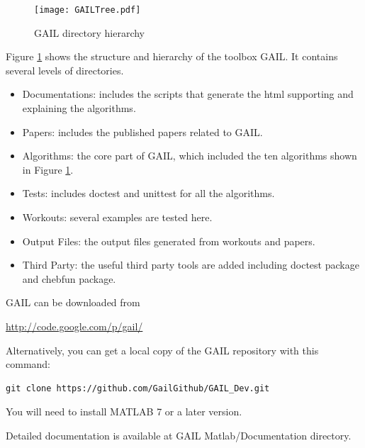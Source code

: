 \documentclass{iitthesis}
\theoremstyle{definition}
\begin{document}
\begin{figure}
\centering
\texttt{[image: GAILTree.pdf]} 
\caption{GAIL directory hierarchy \label{GAILTree}}
\end{figure}


Figure \ref{GAILTree} shows the structure and hierarchy of the toolbox GAIL. It contains several levels of directories.
\begin{itemize}
\item Documentations: includes the scripts that generate the html supporting and explaining the algorithms.
\item Papers: includes the published papers related to GAIL.
\item Algorithms: the core part of GAIL, which included the ten algorithms shown in Figure \ref{GAILTree}.
\item Tests: includes doctest and unittest for all the algorithms.
\item Workouts: several examples are tested here.
\item Output Files: the output files generated from workouts and papers.
\item Third Party: the useful third party tools are added including doctest package and chebfun package.
\end{itemize}

GAIL can be downloaded from

\url{http://code.google.com/p/gail/}

Alternatively, you can get a local copy of the GAIL repository with this command:
\begin{lstlisting}
git clone https://github.com/GailGithub/GAIL_Dev.git
\end{lstlisting}

You will need to install MATLAB 7 or a later version.


Detailed documentation is available at GAIL Matlab/Documentation directory.
\end{document}

